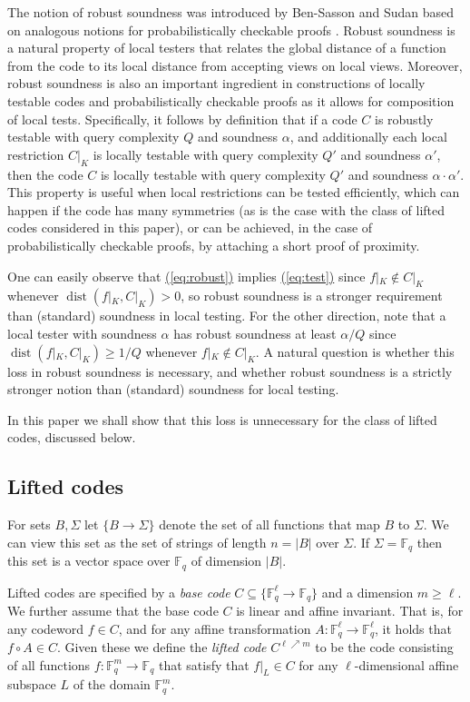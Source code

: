 \documentclass{toc}
\renewcommand{\eqref}[1]{\hyperref[#1]{(\ref*{#1})}}
\theoremstyle{plain}
\DeclareMathOperator{\dist}{dist} %
\newcommand{\F}{{\mathbb{F}}}
\begin{document}
The notion of robust soundness was introduced by Ben-Sasson and Sudan \cite{BenSassonS2006} based on analogous notions for probabilistically checkable proofs \cite{BenSassonGHSV2006,DinurR2006}.
Robust %
soundness   %
is a natural property of local testers that relates the global distance of a function from the code to its local distance from accepting views on local views. Moreover, robust soundness is also an important ingredient in constructions of locally testable codes and probabilistically checkable proofs as it allows for composition of local tests. Specifically, it follows by definition that if a code $C$ is robustly testable with query complexity $Q$ and soundness $\alpha$, and additionally each local restriction $C|_K$ is locally testable with query complexity $Q'$ and soundness $\alpha'$, then the code $C$ is locally testable with query complexity $Q'$ and soundness $\alpha \cdot \alpha'$. This property is useful when local restrictions can be tested efficiently, %
which can happen if the code has many symmetries (as is the case with
the class of lifted codes considered in this %
paper),  %
or can be achieved, in the case of probabilistically checkable
%
proofs,  %
by attaching a short proof of proximity.

One can easily observe that  \eqref{eq:robust} implies \eqref{eq:test} since $f|_K \notin C|_K$ whenever $\dist(f|_K,C|_K)>0$, so robust soundness is a stronger requirement than (standard) soundness in local testing. 
For the other direction, note that a local tester with soundness $\alpha$ has robust soundness at least $\alpha/Q$ since
$\dist(f|_K,C|_K) \geq 1/Q$ whenever $f|_K \notin C|_K$. A natural question is whether this loss in robust soundness is necessary, and whether robust soundness is
a  %
strictly stronger notion than (standard) soundness for local testing.

In this %
paper %
we shall show that this loss is unnecessary for the class of lifted codes, discussed below.

\subsection{Lifted codes}

%
%
For sets $B,\Sigma$ let $\{B \to \Sigma\}$ denote the
set of all functions that map $B$ to $\Sigma$.
We can view this set as the set of strings of
length $n=|B|$ over $\Sigma$.
If $\Sigma=\F_q$ then this set is a vector space over
$\F_q$ of dimension $|B|$.   %

Lifted codes are specified by a \emph{base code} 
$C \subseteq \{\F_q^\ell \to \F_q\}$ and a dimension $m \geq \ell$.
We further assume that the base code $C$ is linear and
%
%
affine invariant.   %
That is, for any codeword $f \in C$, 
and for any affine transformation $A: \F_q^\ell \to \F_q^\ell$,
it holds that $f \circ A \in C$.
Given these we define the \emph{lifted code} $C^{\ell \nearrow m}$ to be the code consisting of all functions $f: \F_q^m \to \F_q$ that satisfy that $f|_L \in C$ for any $\ell$-dimensional affine subspace $L$
of the domain $\F_q^m$.  %
%
\end{document}
